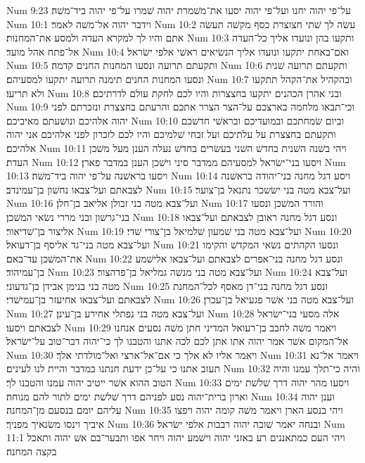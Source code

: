 Num 9:23  על־פי יהוה יחנו ועל־פי יהוה יסעו את־משׁמרת יהוה שׁמרו על־פי יהוה ביד־משׁה׃
Num 10:1  וידבר יהוה אל־משׁה לאמר׃
Num 10:2  עשׂה לך שׁתי חצוצרת כסף מקשׁה תעשׂה אתם והיו לך למקרא העדה ולמסע את־המחנות׃
Num 10:3  ותקעו בהן ונועדו אליך כל־העדה אל־פתח אהל מועד׃
Num 10:4  ואם־באחת יתקעו ונועדו אליך הנשׂיאים ראשׁי אלפי ישׂראל׃
Num 10:5  ותקעתם תרועה ונסעו המחנות החנים קדמה׃
Num 10:6  ותקעתם תרועה שׁנית ונסעו המחנות החנים תימנה תרועה יתקעו למסעיהם׃
Num 10:7  ובהקהיל את־הקהל תתקעו ולא תריעו׃
Num 10:8  ובני אהרן הכהנים יתקעו בחצצרות והיו לכם לחקת עולם לדרתיכם׃
Num 10:9  וכי־תבאו מלחמה בארצכם על־הצר הצרר אתכם והרעתם בחצצרת ונזכרתם לפני יהוה אלהיכם ונושׁעתם מאיביכם׃
Num 10:10  וביום שׂמחתכם ובמועדיכם ובראשׁי חדשׁכם ותקעתם בחצצרת על עלתיכם ועל זבחי שׁלמיכם והיו לכם לזכרון לפני אלהיכם אני יהוה אלהיכם׃
Num 10:11  ויהי בשׁנה השׁנית בחדשׁ השׁני בעשׂרים בחדשׁ נעלה הענן מעל משׁכן העדת׃
Num 10:12  ויסעו בני־ישׂראל למסעיהם ממדבר סיני וישׁכן הענן במדבר פארן׃
Num 10:13  ויסעו בראשׁנה על־פי יהוה ביד־משׁה׃
Num 10:14  ויסע דגל מחנה בני־יהודה בראשׁנה לצבאתם ועל־צבאו נחשׁון בן־עמינדב׃
Num 10:15  ועל־צבא מטה בני ישׂשכר נתנאל בן־צוער׃
Num 10:16  ועל־צבא מטה בני זבולן אליאב בן־חלן׃
Num 10:17  והורד המשׁכן ונסעו בני־גרשׁון ובני מררי נשׂאי המשׁכן׃
Num 10:18  ונסע דגל מחנה ראובן לצבאתם ועל־צבאו אליצור בן־שׁדיאור׃
Num 10:19  ועל־צבא מטה בני שׁמעון שׁלמיאל בן־צורי שׁדי׃
Num 10:20  ועל־צבא מטה בני־גד אליסף בן־דעואל׃
Num 10:21  ונסעו הקהתים נשׂאי המקדשׁ והקימו את־המשׁכן עד־באם׃
Num 10:22  ונסע דגל מחנה בני־אפרים לצבאתם ועל־צבאו אלישׁמע בן־עמיהוד׃
Num 10:23  ועל־צבא מטה בני מנשׁה גמליאל בן־פדהצור׃
Num 10:24  ועל־צבא מטה בני בנימן אבידן בן־גדעוני׃
Num 10:25  ונסע דגל מחנה בני־דן מאסף לכל־המחנת לצבאתם ועל־צבאו אחיעזר בן־עמישׁדי׃
Num 10:26  ועל־צבא מטה בני אשׁר פגעיאל בן־עכרן׃
Num 10:27  ועל־צבא מטה בני נפתלי אחירע בן־עינן׃
Num 10:28  אלה מסעי בני־ישׂראל לצבאתם ויסעו׃
Num 10:29  ויאמר משׁה לחבב בן־רעואל המדיני חתן משׁה נסעים אנחנו אל־המקום אשׁר אמר יהוה אתו אתן לכם לכה אתנו והטבנו לך כי־יהוה דבר־טוב על־ישׂראל׃
Num 10:30  ויאמר אליו לא אלך כי אם־אל־ארצי ואל־מולדתי אלך׃
Num 10:31  ויאמר אל־נא תעזב אתנו כי על־כן ידעת חנתנו במדבר והיית לנו לעינים׃
Num 10:32  והיה כי־תלך עמנו והיה הטוב ההוא אשׁר ייטיב יהוה עמנו והטבנו לך׃
Num 10:33  ויסעו מהר יהוה דרך שׁלשׁת ימים וארון ברית־יהוה נסע לפניהם דרך שׁלשׁת ימים לתור להם מנוחה׃
Num 10:34  וענן יהוה עליהם יומם בנסעם מן־המחנה׃
Num 10:35  ויהי בנסע הארן ויאמר משׁה קומה יהוה ויפצו איביך וינסו משׂנאיך מפניך׃
Num 10:36  ובנחה יאמר שׁובה יהוה רבבות אלפי ישׂראל׃
Num 11:1  ויהי העם כמתאננים רע באזני יהוה וישׁמע יהוה ויחר אפו ותבער־בם אשׁ יהוה ותאכל בקצה המחנה׃
